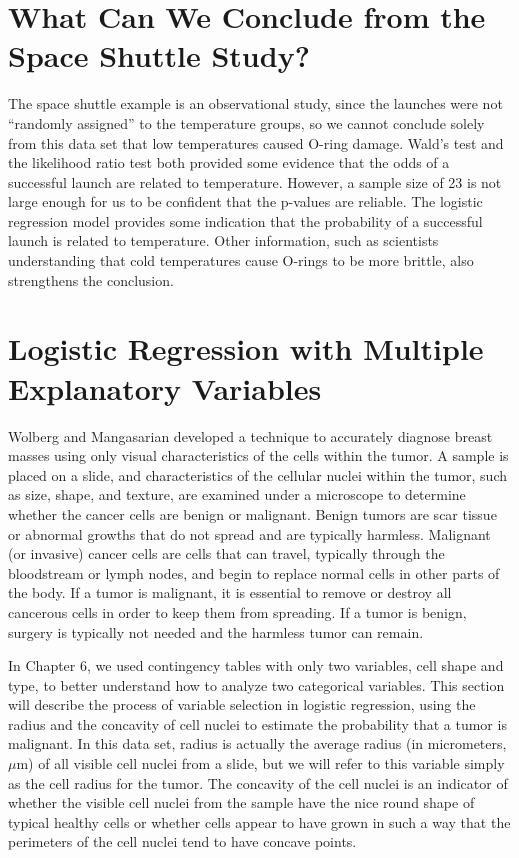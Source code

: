 \documentclass[
]{book}
\begin{document}
\hypertarget{what-can-we-conclude-from-the-space-shuttle-study}{%
\section{What Can We Conclude from the Space Shuttle Study?}\label{what-can-we-conclude-from-the-space-shuttle-study}}

The space shuttle example is an observational study, since the launches were not ``randomly assigned'' to the temperature groups, so we cannot conclude solely from this data set that low temperatures caused O-ring damage. Wald's test and the likelihood ratio test both provided some evidence that the odds of a successful launch are related to temperature. However, a sample size of 23 is not large enough for us to be confident that the p-values are reliable. The logistic regression model provides some indication that the probability of a successful launch is related to temperature. Other information, such as scientists understanding that cold temperatures cause O-rings to be more brittle, also strengthens the conclusion.

\hypertarget{logistic-regression-with-multiple-explanatory-variables}{%
\section{Logistic Regression with Multiple Explanatory Variables}\label{logistic-regression-with-multiple-explanatory-variables}}

Wolberg and Mangasarian developed a technique to accurately diagnose breast masses using only visual characteristics of the cells within the tumor. A sample is placed on a slide, and characteristics of the cellular nuclei within the tumor, such as size, shape, and texture, are examined under a microscope to determine whether the cancer cells are benign or malignant. Benign tumors are scar tissue or abnormal growths that do not spread and are typically harmless. Malignant (or invasive) cancer cells are cells that can travel, typically through the bloodstream or lymph nodes, and begin to replace normal cells in other parts of the body. If a tumor is malignant, it is essential to remove or destroy all cancerous cells in order to keep them from spreading. If a tumor is benign, surgery is typically not needed and the harmless tumor can remain.

In Chapter 6, we used contingency tables with only two variables, cell shape and type, to better understand how to analyze two categorical variables. This section will describe the process of variable selection in logistic regression, using the radius and the concavity of cell nuclei to estimate the probability that a tumor is malignant. In this data set, radius is actually the average radius (in micrometers, \(\mu\)m) of all visible cell nuclei from a slide, but we will refer to this variable simply as the cell radius for the tumor. The concavity of the cell nuclei is an indicator of whether the visible cell nuclei from the sample have the nice round shape of typical healthy cells or whether cells appear to have grown in such a way that the perimeters of the cell nuclei tend to have concave points.
\end{document}
